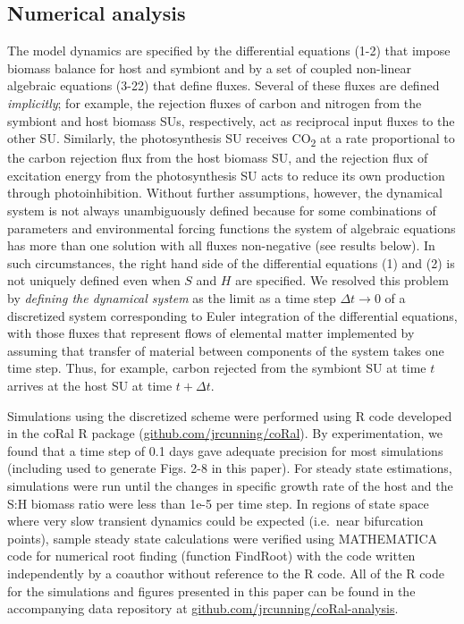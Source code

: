 \documentclass[]{elsarticle} %
\begin{document}
\subsection{Numerical analysis}\label{numerical-analysis}

The model dynamics are specified by the differential equations (1-2)
that impose biomass balance for host and symbiont and by a set of
coupled non-linear algebraic equations (3-22) that define fluxes.
Several of these fluxes are defined \emph{implicitly}; for example, the
rejection fluxes of carbon and nitrogen from the symbiont and host
biomass SUs, respectively, act as reciprocal input fluxes to the other
SU. Similarly, the photosynthesis SU receives CO\textsubscript{2} at a
rate proportional to the carbon rejection flux from the host biomass SU,
and the rejection flux of excitation energy from the photosynthesis SU
acts to reduce its own production through photoinhibition. Without
further assumptions, however, the dynamical system is not always
unambiguously defined because for some combinations of parameters and
environmental forcing functions the system of algebraic equations has
more than one solution with all fluxes non-negative (see results below).
In such circumstances, the right hand side of the differential equations
(1) and (2) is not uniquely defined even when \(S\) and \(H\) are
specified. We resolved this problem by \emph{defining the dynamical
system} as the limit as a time step \(\Delta t \rightarrow 0\) of a
discretized system corresponding to Euler integration of the
differential equations, with those fluxes that represent flows of
elemental matter implemented by assuming that transfer of material
between components of the system takes one time step. Thus, for example,
carbon rejected from the symbiont SU at time \(t\) arrives at the host
SU at time \(t + \Delta t\).

Simulations using the discretized scheme were performed using R code
developed in the coRal R package (\url{github.com/jrcunning/coRal}). By
experimentation, we found that a time step of 0.1 days gave adequate
precision for most simulations (including used to generate Figs. 2-8 in
this paper). For steady state estimations, simulations were run until
the changes in specific growth rate of the host and the S:H biomass
ratio were less than 1e-5 per time step. In regions of state space where
very slow transient dynamics could be expected (i.e.~near bifurcation
points), sample steady state calculations were verified using
MATHEMATICA code for numerical root finding (function FindRoot) with the
code written independently by a coauthor without reference to the R
code. All of the R code for the simulations and figures presented in
this paper can be found in the accompanying data repository at
\url{github.com/jrcunning/coRal-analysis}.
\end{document}

